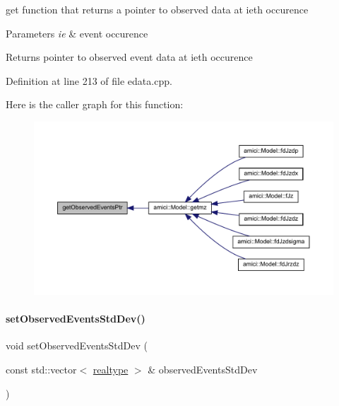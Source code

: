 get function that returns a pointer to observed data at ieth occurence


\begin{DoxyParams}{Parameters}
{\em ie} & event occurence \\
\hline
\end{DoxyParams}
\begin{DoxyReturn}{Returns}
pointer to observed event data at ieth occurence 
\end{DoxyReturn}


Definition at line 213 of file edata.\+cpp.

Here is the caller graph for this function\+:
\nopagebreak
\begin{figure}[H]
\begin{center}
\leavevmode
\includegraphics[width=350pt]{classamici_1_1_exp_data_a95ab3fe91af62612f202fdc6cd033d2a_icgraph}
\end{center}
\end{figure}
\mbox{\label{classamici_1_1_exp_data_af55c1775810031cd4b6e283f6dd220be}} 
\paragraph{\texorpdfstring{set\+Observed\+Events\+Std\+Dev()}{setObservedEventsStdDev()}\hspace{0.1cm}{\footnotesize\ttfamily [1/4]}}
{\footnotesize\ttfamily void set\+Observed\+Events\+Std\+Dev (\begin{DoxyParamCaption}\item[{const std\+::vector$<$ \mbox{\hyperlink{namespaceamici_a1bdce28051d6a53868f7ccbf5f2c14a3}{realtype}} $>$ \&}]{observed\+Events\+Std\+Dev }\end{DoxyParamCaption})}

